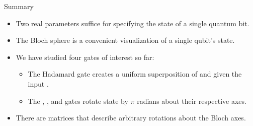 \begin{frame}{Summary}

\begin{itemize}
    \item Two real parameters suffice for specifying the state of a single quantum bit.
    \item The Bloch sphere is a convenient visualization of a single qubit's state.
    \item We have studied four gates of interest so far:
    \begin{itemize}
        \item The Hadamard gate creates a uniform superposition of  and  given the input .
        \item The \PauliX{}, \PauliY{}, and \PauliZ{} gates rotate state by $\pi$ radians about their respective axes.
    \end{itemize}
    \item There are matrices that describe arbitrary rotations about the Bloch axes. 
\end{itemize}
\end{frame}
